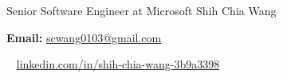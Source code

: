 \begin{cventries}
  \cventry
    {Senior Software Engineer at Microsoft} %
    {Shih Chia Wang} %
    {} %
    {} %
    {
      \begin{cvitems}
        \item {\textbf{Email:} \href{mailto:scwang0103@gmail.com}{scwang0103@gmail.com}}
        \item {\textbf{\faLinkedin\ } \href{https://www.linkedin.com/in/shih-chia-wang-3b9a3398}{linkedin.com/in/shih-chia-wang-3b9a3398}}
      \end{cvitems}
    }
\end{cventries}